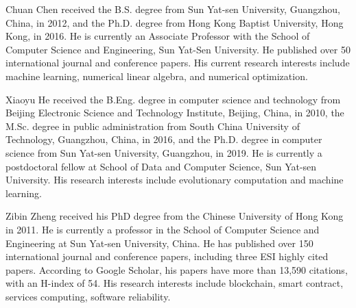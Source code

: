 \documentclass[10pt,journal,compsoc]{IEEEtran}
\begin{document}
\begin{IEEEbiography}
 {Chuan Chen} received the B.S. degree from Sun Yat-sen University, Guangzhou, China, in 2012, and the Ph.D. degree from Hong Kong Baptist University, Hong Kong, in 2016. He is currently an Associate Professor with the School of Computer Science and Engineering, Sun Yat-Sen University. He published over 50 international journal and conference papers. His current research interests include machine learning, numerical linear algebra, and numerical optimization.
\end{IEEEbiography}
\begin{IEEEbiography}
 {Xiaoyu He}
received the B.Eng. degree in computer science and technology from Beijing Electronic Science and Technology Institute, Beijing, China, in 2010, the M.Sc. degree in public administration from South China University of Technology, Guangzhou, China, in 2016, and the Ph.D. degree in computer science from Sun Yat-sen University, Guangzhou, in 2019. He is currently a postdoctoral fellow at School of Data and Computer Science, Sun Yat-sen University. His research interests include evolutionary computation and machine learning.
\end{IEEEbiography}
\begin{IEEEbiography}
  {Zibin Zheng} received his PhD degree from the Chinese University of Hong Kong in 2011. He is currently a professor in the School of Computer Science and Engineering at Sun Yat-sen University, China. He has published over 150 international journal and conference papers, including three ESI highly cited papers. According to Google Scholar, his papers have more than 13,590 citations, with an H-index of 54. His research interests include blockchain, smart contract, services computing, software reliability.
\end{IEEEbiography}




\end{document}

